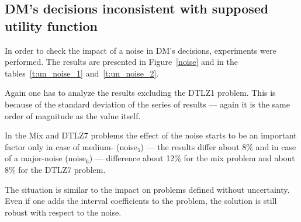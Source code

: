 \clearpage{}

\subsection{DM's decisions inconsistent with supposed utility function}
\label{noise-dm2}


In order to check the impact of a noise in DM's decisions, experiments were
performed. The results are presented in Figure~\ref{noise} and in the
tables~\ref{t:un_noise_1} and~\ref{t:un_noise_2}.

Again one has to analyze the results excluding the DTLZ1 problem. This is
because of the standard deviation of the series of results --- again it is the
same order of magnitude as the value itself.

In the Mix and DTLZ7 problems the effect of the noise starts to be an
important factor only in case of medium- (noise$_5$) --- the results differ
about $8\%$ and in case of a major-noise (noise$_6$) --- difference about 12\%
for the mix problem and about 8\% for the DTLZ7 problem.

The situation is similar to the impact on problems defined without
uncertainty. Even if one adds the interval coefficients to the problem, the
solution is still robust with respect to the noise.



